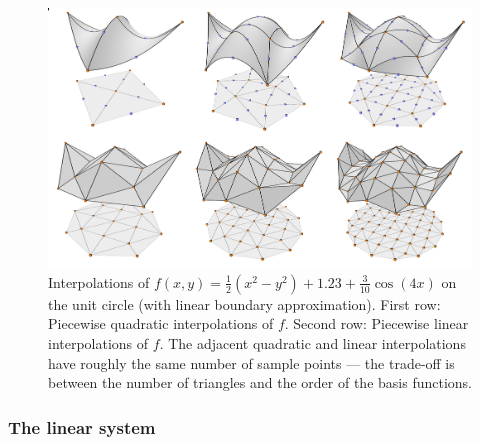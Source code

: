 \begin{figure}[H]
    \begin{center}
        \includegraphics[width=1\linewidth]{figures/quadratic_approx/collage_1.png}
    \end{center}
    \caption{
        Interpolations of $f(x,y) = \frac{1}{2}(x^2 - y^2)+1.23 + \frac{3}{10}\cos(4x)$
        on the unit circle (with linear boundary approximation).
        First row: Piecewise quadratic interpolations of $f$.
        Second row: Piecewise linear interpolations of $f$.
        The adjacent quadratic and linear interpolations have roughly the same number of sample points ---
        the trade-off is between the number of triangles and the order of the basis functions.
    }
    \label{quadratic_approx}
\end{figure}
\subsubsection{The linear system}


